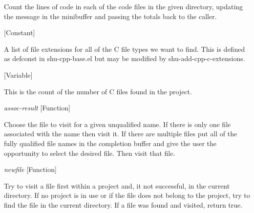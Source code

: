 \begin{doc-string}
Count the lines of code in each of the code files in the given directory, updating
the message in the minibuffer and passing the totals back to the caller.
\end{doc-string}

\vspace{1em}
\noindent
{}
\usebox{\funcname}
 \hfill [Constant]

\begin{doc-string}
A list of file extensions for all of the C file types we want to find.  This is defined
as defconst in shu-cpp-base.el but may be modified by shu-add-cpp-c-extensions.
\end{doc-string}

\vspace{1em}
\noindent
{}
\usebox{\funcname}
 \hfill [Variable]

\begin{doc-string}
This is the count of the number of C files found in the project.
\end{doc-string}

\vspace{1em}
\noindent
{}
\usebox{\funcname}\emph{assoc-result}
 \hfill [Function]

\begin{doc-string}
Choose the file to visit for a given unqualified name.  If there is
only one file associated with the name then visit it.  If there are
multiple files put all of the fully qualified file names in the completion
buffer and give the user the opportunity to select the desired file.  Then
visit that file.
\end{doc-string}

\vspace{1em}
\noindent
{}
\usebox{\funcname}\emph{newfile}
 \hfill [Function]

\begin{doc-string}
Try to visit a file first within a project and, it not successful, in the
current directory.  If no project is in use or if the file does not belong to
the project, try to find the file in the current directory.  If a file was found
and visited, return true.
\end{doc-string}

